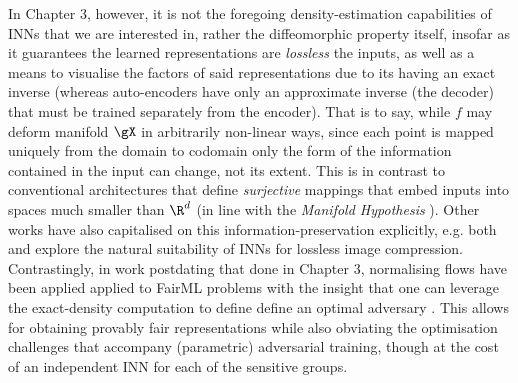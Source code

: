 %
In Chapter 3, however, it is not the foregoing density-estimation capabilities of INNs that we are
interested in, rather the diffeomorphic property itself, insofar as it guarantees the learned
representations are \emph{lossless} \wrt{} the inputs, as well as a means to visualise the factors
of said representations due to its having an exact inverse (whereas auto-encoders have only an
approximate inverse (the decoder) that must be trained separately from the encoder).
%
That is to say, while \(f\) may deform manifold \(\gX\) in arbitrarily non-linear ways, since each
point is mapped uniquely from the domain to codomain only the form of the information contained in
the input can change, not its extent. 
%
This is in contrast to conventional architectures that define \emph{surjective} mappings that embed
inputs into spaces much smaller than \(\R^d\) (in line with the \emph{Manifold Hypothesis}
\citep{fefferman2016testing}).
%
Other works have also capitalised on this information-preservation explicitly, e.g. both
\cite{hoogeboom2019integer} and \cite{xie2021enhanced} explore the natural suitability of INNs for
lossless image compression.
%
Contrastingly, in work postdating that done in Chapter 3, normalising flows have been applied
applied to FairML problems with the insight that one can leverage the exact-density computation to
define define an optimal adversary \citep{balunovic2021fair, cerrato2022fair}. 
%
This allows for obtaining provably fair representations while also obviating the optimisation
challenges that accompany (parametric) adversarial training, though at the cost of an independent
INN for each of the sensitive groups.

